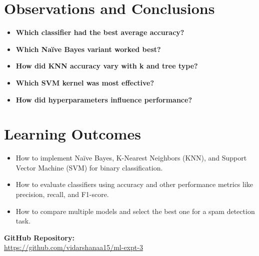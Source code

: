 \documentclass[11pt]{article}
\begin{document}
\section{Observations and Conclusions}
\begin{itemize}
    \item \textbf{Which classifier had the best average accuracy?}
    \item \textbf{Which Naïve Bayes variant worked best?}
    \item \textbf{How did KNN accuracy vary with k and tree type?}
    \item \textbf{Which SVM kernel was most effective?}
    \item \textbf{How did hyperparameters influence performance?}
\end{itemize}

\vspace{0.7cm}
\section{Learning Outcomes}
\begin{itemize}
    \item How to implement Naïve Bayes, K-Nearest Neighbors (KNN), and Support Vector Machine (SVM) for binary classification.
    \item How to evaluate classifiers using accuracy and other performance metrics like precision, recall, and F1-score.
    \item How to compare multiple models and select the best one for a spam detection task.
\end{itemize}

\vspace{1cm}
\noindent
\textbf{GitHub Repository:} \\
\href{https://github.com/vidarshanaa15/ml-expt-3}{https://github.com/vidarshanaa15/ml-expt-3}
\end{document}
